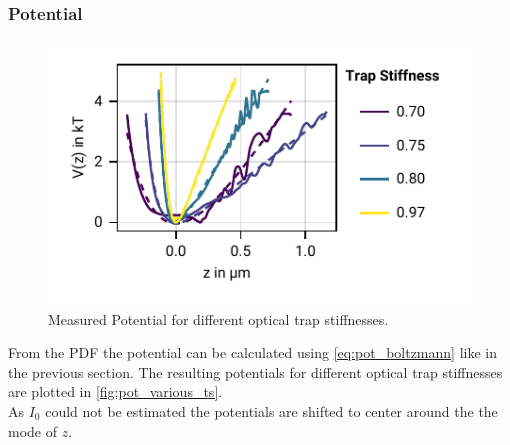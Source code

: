 \documentclass[
    twoside=false,
    twocolumn=true,
    fontsize=11pt,
]{scrarticle}
\begin{document}
\subsubsection*{Potential}
\begin{figure}
    \centering
    \includegraphics{figures/02_05_01_potential.pdf}
    \caption{Measured Potential for different optical trap stiffnesses.}
    \label{fig:pot_various_ts}
\end{figure}
From the PDF the potential can be calculated using \autoref{eq:pot_boltzmann} like in the previous section. 
The resulting potentials for different optical trap stiffnesses are plotted in \autoref{fig:pot_various_ts}.\\
As $I_0$ could not be estimated the potentials are shifted to center around the the mode of $z$.
\end{document}
